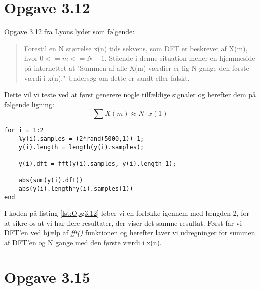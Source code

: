 \documentclass[../main.tex]{subfiles}
\begin{document}
\section{Opgave 3.12}
Opgave 3.12 fra Lyons lyder som følgende:
\begin{quote}
    Forestil en N størrelse x(n) tids sekvens, som DFT er beskrevet af X(m), hvor $0 <= m <= N-1$. 
    Stående i denne situation mener en hjemmeside på internettet at "Summen af alle X(m) værdier er lig N gange den første værdi i x(n)." 
    Undersøg om dette er sandt eller falskt.
\end{quote}

Dette vil vi teste ved at først generere nogle tilfældige signaler og herefter dem på følgende ligning:
\[
    \sum X(m) \approx N \cdot x(1)    
\]

\begin{lstlisting}[caption=MatLab kode til udregning af problematikken fra 3.12, label=lst:Opg3.12]
for i = 1:2
    %y(i).samples = (2*rand(5000,1))-1;
    y(i).length = length(y(i).samples);
    
    y(i).dft = fft(y(i).samples, y(i).length-1);
    
    abs(sum(y(i).dft))
    abs(y(i).length*y(i).samples(1))
end    
\end{lstlisting}

I koden på listing \ref{lst:Opg3.12} løber vi en forløkke igennem med længden 2, for at sikre os at vi har flere resultater, der viser det samme resultat.
Først får vi DFT'en ved hjælp af \textit{fft()} funktionen og herefter laver vi udregninger for summen af DFT'en og N gange med den første værdi i x(n).


\section{Opgave 3.15}
\end{document}

